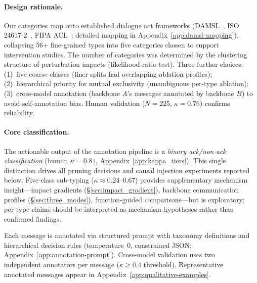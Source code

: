 \paragraph{Design rationale.}
Our categories map onto established dialogue act frameworks (DAMSL~\citep{core_damsl_1997}, ISO 24617-2~\citep{bunt_iso_2012}, FIPA ACL~\citep{fipa_acl_2002}; detailed mapping in Appendix~\ref{app:damsl-mapping}), collapsing 56+ fine-grained types into five categories chosen to support intervention studies. The number of categories was determined by the clustering structure of perturbation impacts (likelihood-ratio test). Three further choices: (1)~five coarse classes (finer splits had overlapping ablation profiles); (2)~hierarchical priority for mutual exclusivity (unambiguous per-type ablation); (3)~cross-model annotation (backbone $A$'s messages annotated by backbone $B$) to avoid self-annotation bias. Human validation ($N = 225$, $\kappa = 0.76$) confirms reliability.

\paragraph{Core classification.}
The actionable output of the annotation pipeline is a \emph{binary ack/non-ack classification} (human $\kappa = 0.81$, Appendix~\ref{app:kappa_tiers}). This single distinction drives all pruning decisions and causal injection experiments reported below. Five-class sub-typing ($\kappa \approx 0.24$--$0.67$) provides supplementary mechanism insight---impact gradients (\S\ref{sec:impact_gradient}), backbone communication profiles (\S\ref{sec:three_modes}), function-guided comparisons---but is exploratory; per-type claims should be interpreted as mechanism hypotheses rather than confirmed findings.

\label{sec:annotation_protocol}
Each message is annotated via structured prompt with taxonomy definitions and hierarchical decision rules (temperature~0, constrained JSON; Appendix~\ref{app:annotation-prompt}). Cross-model validation uses two independent annotators per message ($\kappa \geq 0.4$ threshold). Representative annotated messages appear in Appendix~\ref{app:qualitative-examples}.
